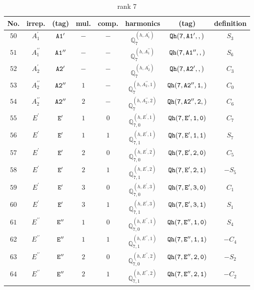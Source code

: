 \documentclass[fleqn,8pt]{jsarticle}
\begin{document}
\begin{table}[ht!]
\begin{center}
\caption{rank 7}
\renewcommand{\arraystretch}{1.3}
\begin{tabular}{cccccccc} \hline \hline
No. & irrep. & (tag) & mul. & comp. & harmonics & (tag) & definition \\ \hline
$ 50 $ & $ A_{1}^{\prime} $ & $ {\tt A1'} $ & $ - $ & $ - $ & $ \mathbb{Q}_{7}^{(h,A_{1}^{\prime})} $ & $ {\tt Qh(7,A1',,)} $ & $ S_{3} $ \\
$ 51 $ & $ A_{1}^{\prime\prime} $ & $ {\tt A1''} $ & $ - $ & $ - $ & $ \mathbb{Q}_{7}^{(h,A_{1}^{\prime\prime})} $ & $ {\tt Qh(7,A1'',,)} $ & $ S_{6} $ \\
$ 52 $ & $ A_{2}^{\prime} $ & $ {\tt A2'} $ & $ - $ & $ - $ & $ \mathbb{Q}_{7}^{(h,A_{2}^{\prime})} $ & $ {\tt Qh(7,A2',,)} $ & $ C_{3} $ \\
$ 53 $ & $ A_{2}^{\prime\prime} $ & $ {\tt A2''} $ & $ 1 $ & $ - $ & $ \mathbb{Q}_{7}^{(h,A_{2}^{\prime\prime},1)} $ & $ {\tt Qh(7,A2'',1,)} $ & $ C_{0} $ \\
$ 54 $ & $ A_{2}^{\prime\prime} $ & $ {\tt A2''} $ & $ 2 $ & $ - $ & $ \mathbb{Q}_{7}^{(h,A_{2}^{\prime\prime},2)} $ & $ {\tt Qh(7,A2'',2,)} $ & $ C_{6} $ \\
$ 55 $ & $ E^{\prime} $ & $ {\tt E'} $ & $ 1 $ & $ 0 $ & $ \mathbb{Q}_{7,0}^{(h,E^{\prime},1)} $ & $ {\tt Qh(7,E',1,0)} $ & $ C_{7} $ \\
$ 56 $ & $ E^{\prime} $ & $ {\tt E'} $ & $ 1 $ & $ 1 $ & $ \mathbb{Q}_{7,1}^{(h,E^{\prime},1)} $ & $ {\tt Qh(7,E',1,1)} $ & $ S_{7} $ \\
$ 57 $ & $ E^{\prime} $ & $ {\tt E'} $ & $ 2 $ & $ 0 $ & $ \mathbb{Q}_{7,0}^{(h,E^{\prime},2)} $ & $ {\tt Qh(7,E',2,0)} $ & $ C_{5} $ \\
$ 58 $ & $ E^{\prime} $ & $ {\tt E'} $ & $ 2 $ & $ 1 $ & $ \mathbb{Q}_{7,1}^{(h,E^{\prime},2)} $ & $ {\tt Qh(7,E',2,1)} $ & $ - S_{5} $ \\
$ 59 $ & $ E^{\prime} $ & $ {\tt E'} $ & $ 3 $ & $ 0 $ & $ \mathbb{Q}_{7,0}^{(h,E^{\prime},3)} $ & $ {\tt Qh(7,E',3,0)} $ & $ C_{1} $ \\
$ 60 $ & $ E^{\prime} $ & $ {\tt E'} $ & $ 3 $ & $ 1 $ & $ \mathbb{Q}_{7,1}^{(h,E^{\prime},3)} $ & $ {\tt Qh(7,E',3,1)} $ & $ S_{1} $ \\
$ 61 $ & $ E^{\prime\prime} $ & $ {\tt E''} $ & $ 1 $ & $ 0 $ & $ \mathbb{Q}_{7,0}^{(h,E^{\prime\prime},1)} $ & $ {\tt Qh(7,E'',1,0)} $ & $ S_{4} $ \\
$ 62 $ & $ E^{\prime\prime} $ & $ {\tt E''} $ & $ 1 $ & $ 1 $ & $ \mathbb{Q}_{7,1}^{(h,E^{\prime\prime},1)} $ & $ {\tt Qh(7,E'',1,1)} $ & $ - C_{4} $ \\
$ 63 $ & $ E^{\prime\prime} $ & $ {\tt E''} $ & $ 2 $ & $ 0 $ & $ \mathbb{Q}_{7,0}^{(h,E^{\prime\prime},2)} $ & $ {\tt Qh(7,E'',2,0)} $ & $ - S_{2} $ \\
$ 64 $ & $ E^{\prime\prime} $ & $ {\tt E''} $ & $ 2 $ & $ 1 $ & $ \mathbb{Q}_{7,1}^{(h,E^{\prime\prime},2)} $ & $ {\tt Qh(7,E'',2,1)} $ & $ - C_{2} $ \\
 \hline \hline
\end{tabular}
\end{center}
\end{table}
\end{document}
